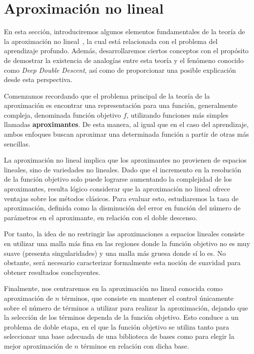 \section{Aproximación no lineal}\label{sec:aproximacion-no-lineal}

En esta sección, introduciremos algunos elementos fundamentales de la teoría de la aproximación no lineal~\cite{DeVore1998}, la cual está relacionada con el problema del aprendizaje profundo. Además, desarrollaremos ciertos conceptos con el propósito de demostrar la existencia de analogías entre esta teoría y el fenómeno conocido como \textit{Deep Double Descent}, así como de proporcionar una posible explicación desde esta perspectiva.\newline

Comenzamos recordando que el problema principal de la teoría de la aproximación es encontrar una representación para una función, generalmente compleja, denominada función objetivo $f$, utilizando funciones más simples llamadas \textbf{aproximantes}. De esta manera, al igual que en el caso del aprendizaje, ambos enfoques buscan aproximar una determinada función a partir de otras más sencillas.\newline

La aproximación no lineal implica que los aproximantes no provienen de espacios lineales, sino de variedades no lineales. Dado que el incremento en la resolución de la función objetivo solo puede lograrse aumentando la complejidad de los aproximantes, resulta lógico considerar que la aproximación no lineal ofrece ventajas sobre los métodos clásicos. Para evaluar esto, estudiaremos la tasa de aproximación, definida como la disminución del error en función del número de parámetros en el aproximante, en relación con el doble descenso.\newline

Por tanto, la idea de no restringir las aproximaciones a espacios lineales consiste en utilizar una malla más fina en las regiones donde la función objetivo no es muy suave (presenta singularidades) y una malla más gruesa donde sí lo es. No obstante, será necesario caracterizar formalmente esta noción de suavidad para obtener resultados concluyentes.\newline

Finalmente, nos centraremos en la aproximación no lineal conocida como aproximación de $n$ términos, que consiste en mantener el control únicamente sobre el número de términos a utilizar para realizar la aproximación, dejando que la selección de los términos dependa de la función objetivo. Esto conduce a un problema de doble etapa, en el que la función objetivo se utiliza tanto para seleccionar una base adecuada de una biblioteca de bases como para elegir la mejor aproximación de $n$ términos en relación con dicha base.

